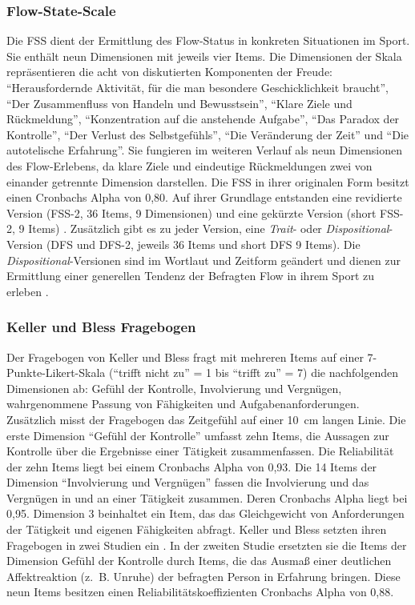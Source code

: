 \subsubsection{Flow-State-Scale}

Die \ac{FSS} dient der Ermittlung des Flow-Status in konkreten Situationen im Sport. Sie enthält neun Dimensionen mit jeweils vier Items. Die Dimensionen der Skala repräsentieren die acht von \citet[S. 73-101]{Csikszentmihalyi1992} diskutierten Komponenten der Freude: "`Herausfordernde Aktivität, für die man besondere Geschicklichkeit braucht"', "`Der Zusammenfluss von Handeln und Bewusstsein"', "`Klare Ziele und Rückmeldung"', "`Konzentration auf die anstehende Aufgabe"', "`Das Paradox der Kontrolle"', "`Der Verlust des Selbstgefühls"', "`Die Veränderung der Zeit"' und "`Die autotelische Erfahrung"'. Sie fungieren im weiteren Verlauf als neun Dimensionen des Flow-Erlebens, da klare Ziele und eindeutige Rückmeldungen zwei von einander getrennte Dimension darstellen. Die \ac{FSS} in ihrer originalen Form besitzt einen Cronbachs Alpha von 0,80. Auf ihrer Grundlage entstanden eine revidierte Version (FSS-2, 36 Items, 9 Dimensionen) und eine gekürzte Version (short FSS-2, 9 Items) \citep[vgl.][]{Jackson2002, Jackson2008}. Zusätzlich gibt es zu jeder Version, eine \emph{Trait}- oder \emph{Dispositional}-Version (\acs{DFS} und DFS-2, jeweils 36 Items und short DFS 9 Items). Die \emph{Dispositional}-Versionen sind im Wortlaut und Zeitform geändert und dienen zur Ermittlung einer generellen Tendenz der Befragten Flow in ihrem Sport zu erleben \citep[vgl.][S.~356]{Jackson1998}.

\subsubsection{Keller und Bless Fragebogen}

Der Fragebogen von Keller und Bless fragt mit mehreren Items auf einer 7-Punkte-Likert-Skala ("`trifft nicht zu"' = 1 bis "`trifft zu"' = 7) die nachfolgenden Dimensionen ab: Gefühl der Kontrolle, Involvierung und Vergnügen, wahrgenommene Passung von Fähigkeiten und Aufgabenanforderungen. Zusätzlich misst der Fragebogen das Zeitgefühl auf einer 10~cm langen Linie. Die erste Dimension "`Gefühl der Kontrolle"' umfasst zehn Items, die Aussagen zur Kontrolle über die Ergebnisse einer Tätigkeit zusammenfassen. Die Reliabilität der zehn Items liegt bei einem Cronbachs Alpha von 0,93. Die 14 Items der Dimension "`Involvierung und Vergnügen"' fassen die Involvierung und das Vergnügen in und an einer Tätigkeit zusammen. Deren Cronbachs Alpha liegt bei 0,95. Dimension 3 beinhaltet ein Item, das das Gleichgewicht von Anforderungen der Tätigkeit und eigenen Fähigkeiten abfragt. Keller und Bless setzten ihren Fragebogen in zwei Studien ein \citep{Keller2008}. In der zweiten Studie ersetzten sie die Items der Dimension Gefühl der Kontrolle durch Items, die das Ausmaß einer deutlichen Affektreaktion (z.~B. Unruhe) der befragten Person in Erfahrung bringen. Diese neun Items besitzen einen Reliabilitätskoeffizienten Cronbachs Alpha von 0,88.

